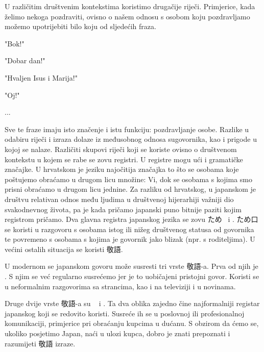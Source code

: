
\author{Ivan Petranović}

	
	
	U različitim društvenim kontekstima koristimo drugačije riječi. Primjerice, kada želimo nekoga pozdraviti, ovisno o našem odnosu s osobom koju pozdravljamo možemo upotrijebiti bilo koju od sljedećih fraza.
	\begin{hyou}
	\item "Bok!"
	\item "Dobar dan!"
	\item "Hvaljen Isus i Marija!"
	\item "Oj!"
	\item ...
	\end{hyou}
	Sve te fraze imaju isto značenje i istu funkciju: pozdravljanje osobe. Razlike u odabiru riječi i izraza dolaze iz međusobnog odnosa sugovornika, kao i prigode u kojoj se nalaze. Različiti skupovi riječi koji se koriste ovisno o društvenom kontekstu u kojem se rabe se zovu registri. U registre mogu ući i gramatičke značajke. U hrvatskom je jeziku najočitija značajka to što se osobama koje poštujemo obraćamo u drugom licu množine: Vi, dok se osobama s kojima smo prisni obraćamo u drugom licu jednine.
	Za razliku od hrvatskog, u japanskom je društvu relativan odnos među ljudima u društvenoj hijerarhiji važniji dio svakodnevnog života, pa je kada pričamo japanski puno bitnije paziti kojim registrom pričamo.
	Dva glavna registra japanskog jezika se zovu ため~ i . ため口 se koristi u razgovoru s osobama istog ili nižeg društvenog statusa od govornika te povremeno s osobama s kojima je govornik jako blizak (npr. s roditeljima). U većini ostalih situacija se koristi 敬語.

	
	U modernom se japanskom govoru može susresti tri vrste 敬語-a. Prva od njih je . S njim se već regularno susrećemo jer je to uobičajeni pristojni govor. Koristi se u neformalnim razgovorima sa strancima, kao i na televiziji i u novinama.
		
	Druge dvije vrste 敬語-a su ~ i . Ta dva oblika zajedno čine najformalniji registar japanskog koji se redovito koristi. Susreće ih se u poslovnoj ili profesionalnoj komunikaciji, primjerice pri obraćanju kupcima u dućanu. S obzirom da ćemo se, ukoliko posjetimo Japan, naći u ulozi kupca, dobro je znati prepoznati i razumijeti 敬語 izraze.
		
